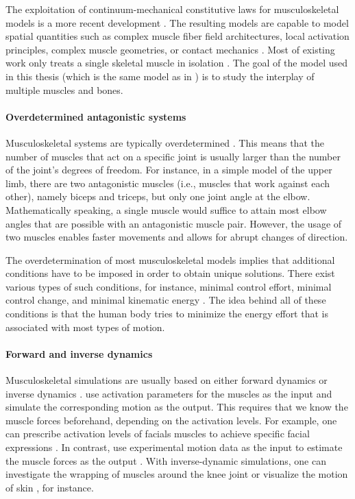 The exploitation of continuum-mechani\-cal constitutive laws
for musculoskeletal models is a more recent development \cite{Roehrle16Two}.
The resulting models are capable to model spatial quantities
such as complex muscle fiber field architectures,
local activation principles, complex muscle geometries, or contact mechanics
.
Most of existing work only treats a single skeletal muscle in isolation
.
The goal of the model used in this thesis
(which is the same model as in
)
is to study the interplay of multiple muscles and bones.

\paragraph{Overdetermined antagonistic systems}

Musculoskeletal systems are typically overdetermined \cite{Roehrle16Two}.
This means that the number of muscles that act on a specific joint
is usually larger than the number of the joint's degrees of freedom.
For instance, in a simple model of the upper limb,
there are two antagonistic muscles
(i.e., muscles that work against each other), namely biceps and triceps,
but only one joint angle at the elbow.
Mathematically speaking, a single muscle would suffice to attain
most elbow angles that are possible with an antagonistic muscle pair.
However, the usage of two muscles enables faster movements and
allows for abrupt changes of direction.

The overdetermination of most musculoskeletal models
implies that additional conditions have to be imposed in order
to obtain unique solutions.
There exist various types of such conditions,
for instance, minimal control effort, minimal control change, and
minimal kinematic energy \cite{Valentin18Gradient}.
The idea behind all of these conditions is that the human body
tries to minimize the energy effort that is associated with
most types of motion.

\paragraph{Forward and inverse dynamics}

Musculoskeletal simulations are usually based on
either forward dynamics or inverse dynamics \cite{Valentin18Gradient}.
 use activation parameters
for the muscles as the input and simulate the corresponding motion
as the output.
This requires that we know the muscle forces beforehand,
depending on the activation levels.
For example, one can prescribe activation levels of facials muscles
to achieve specific facial expressions \cite{Wu13Modelling}.
In contrast, 
use experimental motion data as the input
to estimate the muscle forces as the output \cite{Roehrle16Two}.
With inverse-dynamic simulations,
one can investigate the wrapping of muscles
around the knee joint \cite{Fernandez05Anatomically} or
visualize the motion of skin \cite{Lee09Comprehensive}, for instance.



